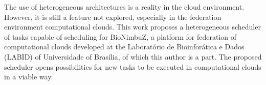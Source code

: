 The use of heterogeneous architectures is a reality in the cloud environment. However, it is still a feature not explored, especially in the federation environment computational clouds. This work proposes a heterogeneous scheduler of tasks capable of scheduling for BioNimbuZ, a platform for federation of computational clouds developed at the Laboratório de Bioinforática e Dados (LABID) of Universidade of Brasília, of which this author is a part. The proposed scheduler opens possibilities for new tasks to be executed in computational clouds in a viable way.